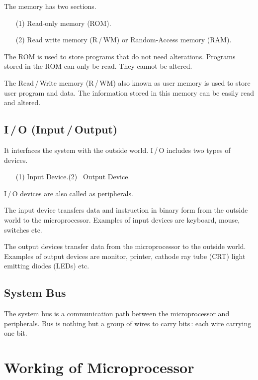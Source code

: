The memory has two sections.
\begin{itemize}
\item[(1)] Read-only memory (ROM).

\item[(2)] Read write memory (R\,/\,WM) or Random-Access memory (RAM).
\end{itemize}

The ROM is used to store programs that do not need alterations. Programs stored in the ROM can only be read. They cannot be altered.

The Read\,/\,Write memory (R\,/\,WM) also known as user memory is used to store user program and data. The information stored in this memory can be easily read and altered.

\subsection{I\,/\,O (Input\,/\,Output)}\label{sec7.4.5}

It interfaces the system with the outside world. I\,/\,O includes two types of devices.
\begin{itemize}
\item[(1)] Input Device.\qquad\quad (2)~ Output Device.
\end{itemize}
I\,/\,O devices are also called as peripherals.

The input device transfers data and instruction in binary form from the outside world to the microprocessor. Examples of input devices are keyboard, mouse, switches etc.

The output devices transfer data from the microprocessor to the outside world. Examples of output devices are monitor, printer, cathode ray tube (CRT) light emitting diodes (LEDs) etc.

\subsection{System Bus}\label{sec7.4.6}

The system bus is a communication path between the microprocessor and peripherals. Bus is nothing but a group of wires to carry bits\,: each wire carrying one bit.

\section{Working of Microprocessor}\label{sec7.5}

